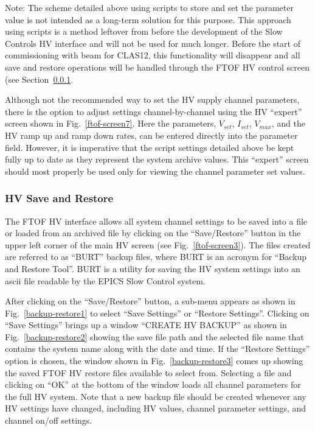 \documentclass[letterpaper,10pt]{article}
\begin{document}
Note: The scheme detailed above using scripts to store and set the parameter value is not intended
as a long-term solution for this purpose. This approach using scripts is a method leftover from before 
the development of the Slow Controls HV interface and will not be used for much longer. Before the 
start of commissioning with beam for CLAS12, this functionality will disappear and all save and restore 
operations will be handled through the FTOF HV control screen (see Section~\ref{save-restore}.

Although not the recommended way to set the HV supply channel parameters, there is the option to adjust
settings channel-by-channel using the HV ``expert'' screen shown in Fig.~\ref{ftof-screen7}. Here the 
parameters, $V_{set}$, $I_{set}$, $V_{max}$, and the HV ramp up and ramp down rates, can be entered 
directly into the parameter field. However, it is imperative that the script settings detailed 
above be kept fully up to date as they represent the system archive values. This ``expert'' screen
should most properly be used only for viewing the channel parameter set values.

\subsubsection{HV Save and Restore}
\label{save-restore}

The FTOF HV interface allows all system channel settings to be saved into a file or loaded from an
archived file by clicking on the ``Save/Restore'' button in the upper left corner of the main HV
screen (see Fig.~\ref{ftof-screen3}). The files created are referred to as ``BURT'' backup files,
where BURT is an acronym for ``Backup and Restore Tool''. BURT is a utility for saving the HV system
settings into an ascii file readable by the EPICS Slow Control system.

After clicking on the ``Save/Restore'' button, a sub-menu appears as shown in Fig.~\ref{backup-restore1}
to select ``Save Settings'' or ``Restore Settings''. Clicking on ``Save Settings'' brings up a window
``CREATE HV BACKUP'' as shown in Fig.~\ref{backup-restore2} showing the save file path and the selected
file name that contains the system name along with the date and time. If the ``Restore Settings'' option
is chosen, the window shown in Fig.~\ref{backup-restore3} comes up showing the saved FTOF HV restore
files available to select from. Selecting a file and clicking on ``OK'' at the bottom of the window
loads all channel parameters for the full HV system. Note that a new backup file should be created 
whenever any HV settings have changed, including HV values, channel parameter settings, and channel 
on/off settings.
\end{document}
